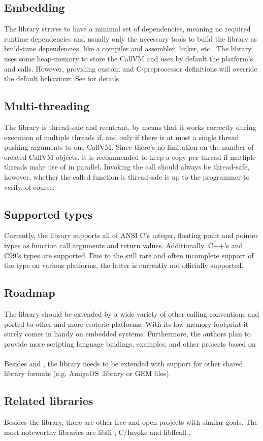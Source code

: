 \subsection{Embedding}

The  library strives to have a minimal set of dependencies,
meaning no required runtime dependencies and usually only the necessary tools
to build the library as build-time dependencies, like a compiler and assembler,
linker, etc..
The library uses some heap-memory to store the CallVM and uses by default the
platform's  and  calls. However, providing custom
 and  C-preprocessor definitions will override
the default behaviour.
See  for details.


\subsection{Multi-threading}

The  library is thread-safe and reentrant, by means that it
works correctly during execution of multiple threads if, and only if there is
at most a single thread pushing arguments to one CallVM. Since there's no
limitation on the number of created CallVM objects, it is recommended to keep a
copy per thread if mutliple threads make use of  in parallel.
Invoking the call should always be thread-safe, however, whether the called
function is thread-safe is up to the programmer to verify, of course.

\subsection{Supported types}

Currently, the  library supports all of ANSI C's integer,
floating point and pointer types as function call arguments and return values.
Additionally, C++'s  and C99's  types are supported.
Due to the still rare and often incomplete support of the 
type on various platforms, the latter is currently not officially supported.

\subsection{Roadmap}

The  library should be extended by a wide variety of other
calling conventions and ported to other and more esoteric platforms. With its
low memory footprint it surely comes in handy on embedded systems.
Furthermore, the authors plan to provide more scripting language bindings,
examples, and other projects based on .\\
Besides  and , the 
library needs to be extended with support for other shared library formats
(e.g. AmigaOS .library or GEM \cite{.ldg} files).


\subsection{Related libraries}

Besides the  library, there are other free and open projects
with similar goals. The most noteworthy libraries are libffi \cite{libffi},
C/Invoke \cite{cinvoke} and libffcall \cite{libffcall}.

